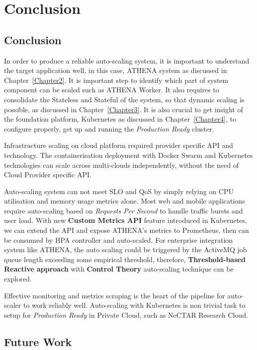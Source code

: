 \chapter{Conclusion}

\label{Chapter6}

\section{Conclusion}

In order to produce a reliable auto-scaling system, it is important to understand the target application well, in this case, ATHENA system as discussed in Chapter~\ref{Chapter2}. It is important step to identify which part of system component can be scaled such as ATHENA Worker. It also requires to consolidate the Stateless and Stateful of the system, so that dynamic scaling is possible, as discussed in Chapter~\ref{Chapter3}. It is also crucial to get insight of the foundation platform, Kubernetes as discussed in Chapter~\ref{Chapter4}, to configure properly, get up and running the \emph{Production Ready} cluster. 

Infrastructure scaling on cloud platform required provider specific API and technology. The containerisation deployment with Docker Swarm and Kubernetes technologies can scale across multi-clouds independently, without the need of Cloud Provider specific API.

Auto-scaling system can not meet SLO and QoS by simply relying on CPU utilisation and memory usage metrics alone. Most web and mobile applications require auto-scaling based on \textit{Requests Per Second} to handle traffic bursts and user load. With new \textbf{Custom Metrics API} feature introduced in Kubernetes, we can extend the API and expose ATHENA's metrics to Prometheus, then can be consumed by HPA controller and auto-scaled. For enterprise integration system like ATHENA, the auto scaling could be triggered by the ActiveMQ job queue length exceeding some empirical threshold, therefore, \textbf{Threshold-based Reactive approach} with \textbf{Control Theory} auto-scaling technique can be explored.

Effective monitoring and metrics scraping is the heart of the pipeline for auto-scaler to work reliably well. Auto-scaling with Kubernetes is non trivial task to setup for \emph{Production Ready} in Private Cloud, such as NeCTAR Research Cloud.


\section{Future Work}

